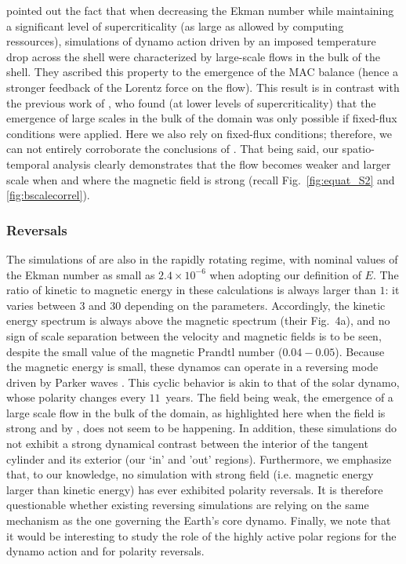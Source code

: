 \documentclass[12pt, a4paper]{article}
\begin{document}
\cite{yadav2016b} pointed out the fact that when decreasing the Ekman number while maintaining a significant level of supercriticality (as large as allowed by computing ressources), simulations of dynamo action driven by an imposed temperature drop across the shell  were characterized by large-scale flows in the bulk of the shell.
They ascribed this property to the emergence of the MAC balance (hence a stronger feedback of the Lorentz force on the flow). This result is in contrast with the previous work of \cite{sakuraba2009}, who found (at lower levels of supercriticality) that the emergence of large scales in the bulk of the domain  was only possible if fixed-flux conditions were applied.
Here we also rely on fixed-flux conditions; therefore, we can not entirely corroborate the conclusions of \cite{yadav2016b}.
That being said, our spatio-temporal  analysis clearly demonstrates that the flow becomes weaker and larger scale when and where the magnetic field is strong (recall Fig.~\ref{fig:equat_S2} and \ref{fig:bscalecorrel}).


\subsubsection{Reversals}
The simulations of \cite{sheyko2016} are also in the rapidly rotating regime, with nominal values of the Ekman number as small as $2.4\times10^{-6}$ when adopting our definition of $E$.
The ratio of kinetic to magnetic energy in these calculations is always larger than $1$: it varies between $3$ and $30$ depending on the parameters.
Accordingly, the kinetic energy spectrum is always above the  magnetic spectrum (their Fig.~4a), and no sign of scale separation between the velocity and magnetic fields is to be seen, despite the small value of the magnetic Prandtl number ($0.04-0.05$).
Because the magnetic energy is small, these dynamos can operate in a reversing mode driven by Parker waves \citep[see also][]{schaeffer2006,busse2006parameter,tobias2013,schrinner2014topology}.
This cyclic behavior is akin to that of the solar dynamo, whose polarity changes every $11$~years. 
The field being weak, the emergence of a large scale flow in the bulk of the domain, as highlighted here when the field is strong and by \cite{yadav2016b}, does not seem to be happening.
In addition, these simulations do not exhibit a strong dynamical contrast between the interior of the tangent cylinder and its exterior (our `in' and 'out' regions).
Furthermore, we emphasize that, to our knowledge, no simulation with strong field (i.e. magnetic energy larger than kinetic energy) has ever exhibited polarity reversals.
It is therefore questionable whether existing reversing simulations are relying on the same mechanism as the one governing the Earth's core dynamo.
Finally, we note that it would be interesting to study the role of the highly active polar regions for the dynamo action and for polarity reversals.
\end{document}
